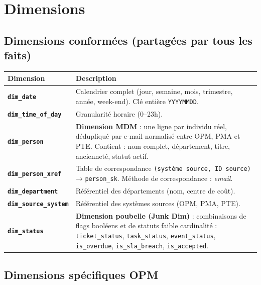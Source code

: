 \documentclass[a4paper,12pt]{article}
\begin{document}
\section{Dimensions}

\subsection{Dimensions conformées (partagées par tous les faits)}

\begin{tabularx}{\textwidth}{>{\bfseries}p{3.5cm} X}
\toprule
Dimension & Description \\
\midrule
\texttt{dim\_date}         & Calendrier complet (jour, semaine, mois, trimestre, année, week-end).
                             Clé entière \texttt{YYYYMMDD}. \\
\texttt{dim\_time\_of\_day}& Granularité horaire (0--23h). \\
\texttt{dim\_person}       & \textbf{Dimension MDM} : une ligne par individu réel, dédupliqué
                             par e-mail normalisé entre OPM, PMA et PTE. Contient : nom complet,
                             département, titre, ancienneté, statut actif. \\
\texttt{dim\_person\_xref} & Table de correspondance \texttt{(système source, ID source)} →
                             \texttt{person\_sk}. Méthode de correspondance : \textit{email}. \\
\texttt{dim\_department}   & Référentiel des départements (nom, centre de coût). \\
\texttt{dim\_source\_system}& Référentiel des systèmes sources (OPM, PMA, PTE). \\
\texttt{dim\_status}       & \textbf{Dimension poubelle (Junk Dim)} : combinaisons de flags
                             booléens et de statuts faible cardinalité :
                             \texttt{ticket\_status}, \texttt{task\_status}, \texttt{event\_status},
                             \texttt{is\_overdue}, \texttt{is\_sla\_breach}, \texttt{is\_accepted}. \\
\bottomrule
\end{tabularx}

\subsection{Dimensions spécifiques OPM}
\end{document}
